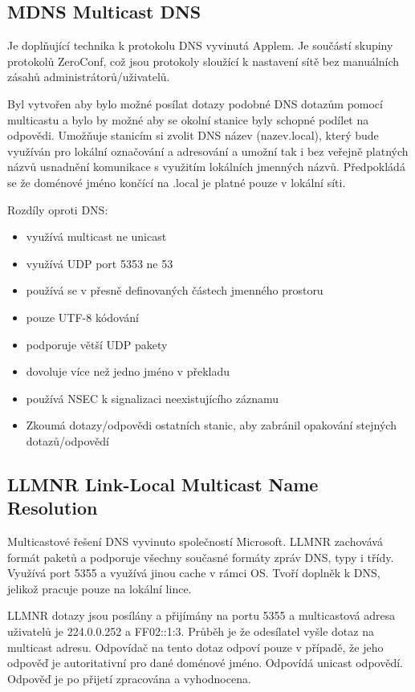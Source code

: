 \subsection{MDNS Multicast DNS}

Je doplňující technika k protokolu DNS vyvinutá Applem.
Je součástí skupiny protokolů ZeroConf, což jsou protokoly sloužící k nastavení sítě bez manuálních zásahů administrátorů/uživatelů.

Byl vytvořen aby bylo možné posílat dotazy podobné DNS dotazům pomocí multicastu a bylo by možné aby se okolní stanice byly schopné podílet na odpovědi.
Umožňuje stanicím si zvolit DNS název (nazev.local), který bude využíván pro lokální označování a adresování a umožní tak i bez veřejně platných názvů usnadnění komunikace s využitím lokálních jmenných názvů.
Předpokládá se že doménové jméno končící na .local je platné pouze v lokální síti.

Rozdíly oproti DNS:
\begin{itemize}[noitemsep]
    \item využívá multicast ne unicast
    \item využívá UDP port 5353 ne 53
    \item používá se v přesně definovaných částech jmenného prostoru
    \item pouze UTF-8 kódování
    \item podporuje větší UDP pakety
    \item dovoluje více než jedno jméno v překladu
    \item používá NSEC k signalizaci neexistujícího záznamu
    \item Zkoumá dotazy/odpovědi ostatních stanic, aby zabránil opakování stejných dotazů/odpovědí
\end{itemize}

\subsection{LLMNR Link-Local Multicast Name Resolution}

Multicastové řešení DNS vyvinuto společností Microsoft.
LLMNR zachovává formát paketů a podporuje všechny současné formáty zpráv DNS, typy i třídy.
Využívá port 5355 a využívá jinou cache v rámci OS.
Tvoří doplněk k DNS, jelikož pracuje pouze na lokální lince.

LLMNR dotazy jsou posílány a přijímány na portu 5355 a multicastová adresa uživatelů je 224.0.0.252 a FF02::1:3.
Průběh je že odesílatel vyšle dotaz na multicast adresu.
Odpovídač na tento dotaz odpoví pouze v případě, že jeho odpověď je autoritativní pro dané doménové jméno.
Odpovídá unicast odpovědí.
Odpověď je po přijetí zpracována a vyhodnocena.


